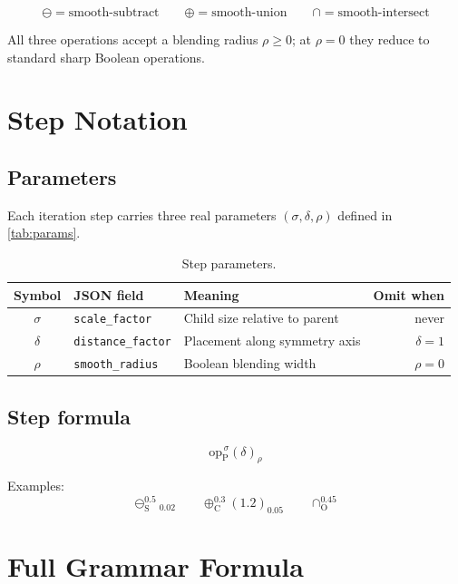 \documentclass[11pt, a4paper]{article}
\newcommand{\prim}[1]{\mathrm{#1}}
\newcommand{\sub}{\ominus}
\newcommand{\add}{\oplus}
\newcommand{\intr}{\cap}
\newcommand{\code}[1]{\texttt{#1}}
\begin{document}
\[
  \sub = \text{smooth-subtract} \qquad
  \add = \text{smooth-union}    \qquad
  \intr = \text{smooth-intersect}
\]

All three operations accept a blending radius $\rho \geq 0$; at $\rho = 0$ they
reduce to standard sharp Boolean operations.

\section{Step Notation}
\label{sec:step}

\subsection{Parameters}
\label{subsec:params}

Each iteration step carries three real parameters
$(\sigma, \delta, \rho)$ defined in \autoref{tab:params}.

\begin{table}[h]
\centering
\caption{Step parameters.}
\label{tab:params}
\begin{tabular}{cllr}
\toprule
Symbol & JSON field & Meaning & Omit when \\
\midrule
$\sigma$ & \code{scale\_factor}    & Child size relative to parent   & never \\
$\delta$ & \code{distance\_factor} & Placement along symmetry axis   & $\delta = 1$ \\
$\rho$   & \code{smooth\_radius}   & Boolean blending width          & $\rho = 0$ \\
\bottomrule
\end{tabular}
\end{table}

\subsection{Step formula}
\label{subsec:step_formula}

\[
  \boxed{\; \mathrm{op}_{\prim{P}}^{\,\sigma}(\delta)_{\rho} \;}
\]

\noindent Examples:
\[
  \sub_{\prim{S}}^{0.5}{}_{\!0.02}
  \qquad
  \add_{\prim{C}}^{0.3}(1.2)_{\!0.05}
  \qquad
  \intr_{\prim{O}}^{0.45}
\]

\section{Full Grammar Formula}
\label{sec:formula}
\end{document}
